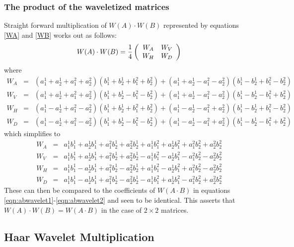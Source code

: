 \subsubsection{The product of the waveletized matrices}

Straight forward multiplication of $W(A) \cdot W(B)$ represented by equations \ref{WA} and \ref{WB} works out as follows:
\[
W(A) \cdot W(B) = 
{1 \over 4} 
\left(
\begin{array}{cc}
W_A & W_V \\
W_H & W_D
\end{array}
\right)
\]
where
\begin{eqnarray*}
W_A &=& (a^1_1 + a^1_2 + a^2_1 + a^2_2)( b^1_1 + b^1_2 + b^2_1 + b^2_2) + ( a^1_1 + a^1_2 - a^2_1 - a^2_2)(b^1_1 - b^1_2 + b^2_1 - b^2_2) \\
W_V &=& ( a^1_1 + a^1_2 + a^2_1 + a^2_2) ( b^1_1 + b^1_2 - b^2_1 - b^2_2) + (a^1_1 + a^1_2 - a^2_1 - a^2_2) ( b^1_1 - b^1_2 - b^2_1 + b^2_2)  \\
W_H &=&  ( a^1_1 - a^1_2 + a^2_1 - a^2_2)(b^1_1 + b^1_2 + b^2_1 + b^2_2) +  ( a^1_1 - a^1_2 - a^2_1 + a^2_2 ) (b^1_1 - b^1_2 + b^2_1 - b^2_2) \\
W_D &=& ( a^1_1 - a^1_2 + a^2_1 - a^2_2) (b^1_1 + b^1_2 - b^2_1 - b^2_2)+( a^1_1 - a^1_2 - a^2_1 + a^2_2 )(b^1_1 - b^1_2 - b^2_1 + b^2_2)
\end{eqnarray*}
which simplifies to
\begin{eqnarray*}
W_A &=& a^1_1 b^1_1 + a^1_2 b^1_1 + a^2_1 b^1_2 + a^2_2 b^1_2 + a^1_1 b^2_1 + a^1_2 b^2_1 + a^2_1 b^2_2 + a^2_2 b^2_2 \\
W_V &=& a^1_1 b^1_1 + a^1_2 b^1_1 + a^2_1 b^1_2 + a^2_2 b^1_2 - a^1_1 b^2_1 - a^1_2 b^2_1 - a^2_1 b^2_2 - a^2_2 b^2_2 \\
W_H &=& a^1_1 b^1_1 - a^1_2 b^1_1 + a^2_1 b^1_2 - a^2_2 b^1_2 + a^1_1 b^2_1 - a^1_2 b^2_1 + a^2_1 b^2_2 - a^2_2 b^2_2 \\
W_D &=& a^1_1 b^1_1 - a^1_2 b^1_1 + a^2_1 b^1_2 - a^2_2 b^1_2 - a^1_1 b^2_1 + a^1_2 b^2_1 - a^2_1 b^2_2 + a^2_2 b^2_2 
\end{eqnarray*}
These can then be compared to the coefficients of $W(A \cdot B)$ in equations \ref{eqn:abwavelet1}-\ref{eqn:abwavelet2} and seen to be identical. This asserts that $W(A) \cdot W(B) = W(A \cdot B)$ in the case of $2 \times 2$ matrices.

\subsection{Haar Wavelet Multiplication}

